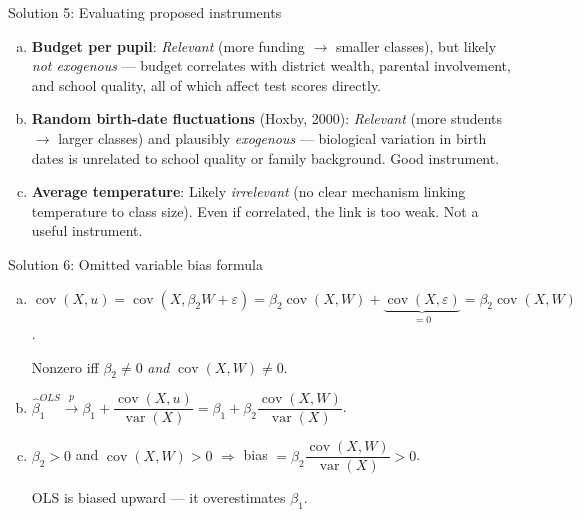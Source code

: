\documentclass[10pt]{beamer}
\begin{document}
\begin{frame}{Solution 5: Evaluating proposed instruments}
\label{s5}
\begin{enumerate}[(a)]
  \item \textbf{Budget per pupil}: \emph{Relevant} (more funding $\to$ smaller classes), but likely \emph{not exogenous} --- budget correlates with district wealth, parental involvement, and school quality, all of which affect test scores directly.

  \item \textbf{Random birth-date fluctuations} (Hoxby, 2000): \emph{Relevant} (more students $\to$ larger classes) and plausibly \emph{exogenous} --- biological variation in birth dates is unrelated to school quality or family background. \alert{Good instrument.}

  \item \textbf{Average temperature}: Likely \emph{irrelevant} (no clear mechanism linking temperature to class size). Even if correlated, the link is too weak. Not a useful instrument.
\end{enumerate}

\vfill
\hfill\hyperlink{q5}{}
\end{frame}

\begin{frame}{Solution 6: Omitted variable bias formula}
\label{s6}
\begin{enumerate}[(a)]
  \item $\operatorname{cov}(X, u) = \operatorname{cov}(X, \beta_2 W + \varepsilon) = \beta_2\operatorname{cov}(X,W) + \underbrace{\operatorname{cov}(X,\varepsilon)}_{=0} = \beta_2\operatorname{cov}(X,W)$.

  Nonzero iff $\beta_2 \neq 0$ \emph{and} $\operatorname{cov}(X,W) \neq 0$.

  \item $\widehat{\beta}_1^{OLS} \xrightarrow{p} \beta_1 + \dfrac{\operatorname{cov}(X,u)}{\operatorname{var}(X)} = \beta_1 + \beta_2\dfrac{\operatorname{cov}(X,W)}{\operatorname{var}(X)}$. \checkmark

  \item $\beta_2 > 0$ and $\operatorname{cov}(X,W) > 0$ $\Rightarrow$ bias $= \beta_2\dfrac{\operatorname{cov}(X,W)}{\operatorname{var}(X)} > 0$.

  OLS is \alert{biased upward} --- it overestimates $\beta_1$.
\end{enumerate}

\vfill
\hfill\hyperlink{q6}{}
\end{frame}
\end{document}
